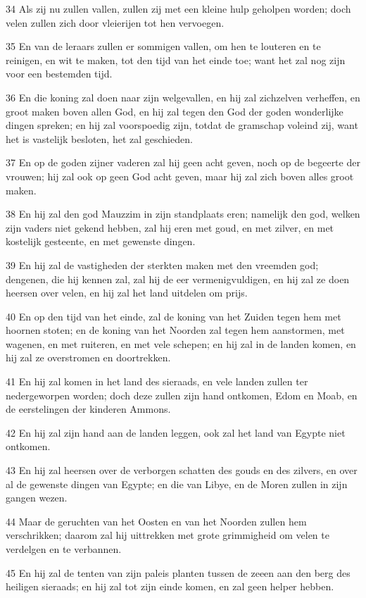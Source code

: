 \par 34 Als zij nu zullen vallen, zullen zij met een kleine hulp geholpen worden; doch velen zullen zich door vleierijen tot hen vervoegen.
\par 35 En van de leraars zullen er sommigen vallen, om hen te louteren en te reinigen, en wit te maken, tot den tijd van het einde toe; want het zal nog zijn voor een bestemden tijd.
\par 36 En die koning zal doen naar zijn welgevallen, en hij zal zichzelven verheffen, en groot maken boven allen God, en hij zal tegen den God der goden wonderlijke dingen spreken; en hij zal voorspoedig zijn, totdat de gramschap voleind zij, want het is vastelijk besloten, het zal geschieden.
\par 37 En op de goden zijner vaderen zal hij geen acht geven, noch op de begeerte der vrouwen; hij zal ook op geen God acht geven, maar hij zal zich boven alles groot maken.
\par 38 En hij zal den god Mauzzim in zijn standplaats eren; namelijk den god, welken zijn vaders niet gekend hebben, zal hij eren met goud, en met zilver, en met kostelijk gesteente, en met gewenste dingen.
\par 39 En hij zal de vastigheden der sterkten maken met den vreemden god; dengenen, die hij kennen zal, zal hij de eer vermenigvuldigen, en hij zal ze doen heersen over velen, en hij zal het land uitdelen om prijs.
\par 40 En op den tijd van het einde, zal de koning van het Zuiden tegen hem met hoornen stoten; en de koning van het Noorden zal tegen hem aanstormen, met wagenen, en met ruiteren, en met vele schepen; en hij zal in de landen komen, en hij zal ze overstromen en doortrekken.
\par 41 En hij zal komen in het land des sieraads, en vele landen zullen ter nedergeworpen worden; doch deze zullen zijn hand ontkomen, Edom en Moab, en de eerstelingen der kinderen Ammons.
\par 42 En hij zal zijn hand aan de landen leggen, ook zal het land van Egypte niet ontkomen.
\par 43 En hij zal heersen over de verborgen schatten des gouds en des zilvers, en over al de gewenste dingen van Egypte; en die van Libye, en de Moren zullen in zijn gangen wezen.
\par 44 Maar de geruchten van het Oosten en van het Noorden zullen hem verschrikken; daarom zal hij uittrekken met grote grimmigheid om velen te verdelgen en te verbannen.
\par 45 En hij zal de tenten van zijn paleis planten tussen de zeeen aan den berg des heiligen sieraads; en hij zal tot zijn einde komen, en zal geen helper hebben.

